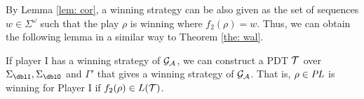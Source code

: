 By Lemma \ref{lem: cor},
a winning strategy can be also given as
the set of sequences $w\in\Sigma^\omega$
such that the play $\rho$ is winning where $f_2(\rho)=w$.
Thus, we can obtain the following lemma
in a similar way to Theorem \ref{the: wal}.
\begin{corollary}
\label{col: 2}
If player I has a winning strategy of ${\cal G}_{\cal A}$,
we can construct a PDT ${\cal T}$ over $\Sigma_\dblI, \Sigma_\dblO$ and $\Gamma'$ that gives a winning strategy of ${\cal G}_{\cal A}$.
That is, $\rho\in \mathit{PL}$ is winning for Player I if $f_2(\rho)\in L({\cal T})$.
\end{corollary}
